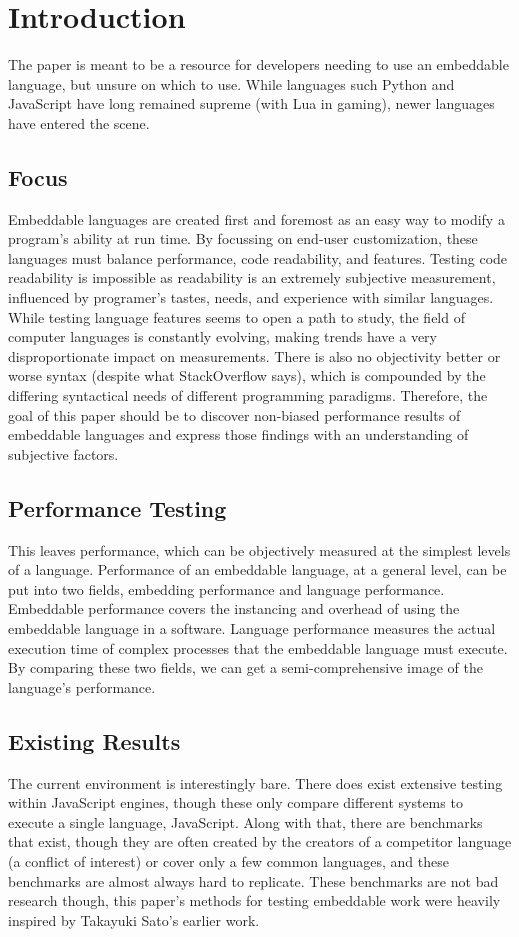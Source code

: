 \section{Introduction} \label{sec:introduction}
The paper is meant to be a resource for developers needing to use an embeddable language, but unsure on which to use. While languages such Python and JavaScript have long remained supreme (with Lua in gaming)\cite{trend:jslua}, newer languages have entered the scene.

\subsection{Focus}
Embeddable languages are created first and foremost as an easy way to modify a program's ability at run time. By focussing on end-user customization, these languages must balance performance, code readability, and features. Testing code readability is impossible as readability is an extremely subjective measurement, influenced by programer's tastes, needs, and experience with similar languages. While testing language features seems to open a path to study, the field of computer languages is constantly evolving, making trends have a very disproportionate impact on measurements. There is also no objectivity better or worse syntax (despite what StackOverflow says), which is compounded by the differing syntactical needs of different programming paradigms. Therefore, the goal of this paper should be to discover non-biased performance results of embeddable languages and express those findings with an understanding of subjective factors.

\subsection{Performance Testing}
This leaves performance, which can be objectively measured at the simplest levels of a language. Performance of an embeddable language, at a general level, can be put into two fields, embedding performance and language performance. Embeddable performance covers the instancing and overhead of using the embeddable language in a software. Language performance measures the actual execution time of complex processes that the embeddable language must execute. By comparing these two fields, we can get a semi-comprehensive image of the language's performance.

\subsection{Existing Results}
The current environment is interestingly bare. There does exist extensive testing within JavaScript engines, though these only compare different systems to execute a single language, JavaScript\cite{arewefastyet}. Along with that, there are benchmarks that exist, though they are often created by the creators of a competitor language (a conflict of interest) or cover only a few common languages, and these benchmarks are almost always hard to replicate. These benchmarks are not bad research though, this paper's methods for testing embeddable work were heavily inspired by Takayuki Sato's earlier work\cite{embench}.
